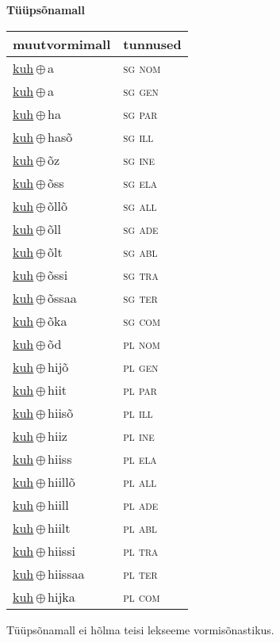 

\vspace{3.5em}
\noindent \begin{minipage}{\textwidth}
\noindent \textbf{Tüüpsõnamall \,}\\

\begin{sideways}
\begin{tabular}{l l}
muutvormimall & tunnused \\
\hline
\underline{kuh}\,$\oplus$\,a & \textsc{ sg nom } \\
\underline{kuh}\,$\oplus$\,a & \textsc{ sg gen } \\
\underline{kuh}\,$\oplus$\,ha & \textsc{ sg par } \\
\underline{kuh}\,$\oplus$\,hasõ & \textsc{ sg ill } \\
\underline{kuh}\,$\oplus$\,õz & \textsc{ sg ine } \\
\underline{kuh}\,$\oplus$\,õss & \textsc{ sg ela } \\
\underline{kuh}\,$\oplus$\,õllõ & \textsc{ sg all } \\
\underline{kuh}\,$\oplus$\,õll & \textsc{ sg ade } \\
\underline{kuh}\,$\oplus$\,õlt & \textsc{ sg abl } \\
\underline{kuh}\,$\oplus$\,õssi & \textsc{ sg tra } \\
\underline{kuh}\,$\oplus$\,õssaa & \textsc{ sg ter } \\
\underline{kuh}\,$\oplus$\,õka & \textsc{ sg com } \\
\underline{kuh}\,$\oplus$\,õd & \textsc{ pl nom } \\
\underline{kuh}\,$\oplus$\,hijõ & \textsc{ pl gen } \\
\underline{kuh}\,$\oplus$\,hiit & \textsc{ pl par } \\
\underline{kuh}\,$\oplus$\,hiisõ & \textsc{ pl ill } \\
\underline{kuh}\,$\oplus$\,hiiz & \textsc{ pl ine } \\
\underline{kuh}\,$\oplus$\,hiiss & \textsc{ pl ela } \\
\underline{kuh}\,$\oplus$\,hiillõ & \textsc{ pl all } \\
\underline{kuh}\,$\oplus$\,hiill & \textsc{ pl ade } \\
\underline{kuh}\,$\oplus$\,hiilt & \textsc{ pl abl } \\
\underline{kuh}\,$\oplus$\,hiissi & \textsc{ pl tra } \\
\underline{kuh}\,$\oplus$\,hiissaa & \textsc{ pl ter } \\
\underline{kuh}\,$\oplus$\,hijka & \textsc{ pl com } \\
\end{tabular}
\end{sideways}
\label{tab:tüüpsõnamall-kuha}

\end{minipage}

 
\vspace{1em}
\noindent Tüüpsõnamall  ei hõlma teisi lekseeme vormi\-sõnastikus.
